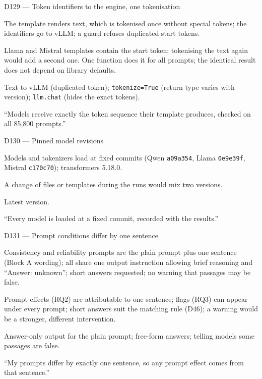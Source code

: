 \documentclass[11pt,a4paper]{report}
\begin{document}
\begin{decisionbox}{D129 --- Token identifiers to the engine, one tokenisation}
\begin{description}[nosep, leftmargin=0pt]
  \item[Decision.] The template renders text, which is tokenised once without special tokens; the identifiers go to vLLM; a guard refuses duplicated start tokens.
  \item[Why.] Llama and Mistral templates contain the start token; tokenising the text again would add a second one. One function does it for all prompts; the identical result does not depend on library defaults.
  \item[Alternatives.] Text to vLLM (duplicated token); \texttt{tokenize=True} (return type varies with version); \texttt{llm.chat} (hides the exact tokens).
  \item[Interview line.] ``Models receive exactly the token sequence their template produces, checked on all 85,800 prompts.''
\end{description}
\end{decisionbox}

\begin{decisionbox}{D130 --- Pinned model revisions}
\begin{description}[nosep, leftmargin=0pt]
  \item[Decision.] Models and tokenizers load at fixed commits (Qwen \texttt{a09a354}, Llama \texttt{0e9e39f}, Mistral \texttt{c170c70}); transformers 5.18.0.
  \item[Why.] A change of files or templates during the runs would mix two versions.
  \item[Alternatives.] Latest version.
  \item[Interview line.] ``Every model is loaded at a fixed commit, recorded with the results.''
\end{description}
\end{decisionbox}

\begin{decisionbox}{D131 --- Prompt conditions differ by one sentence}
\begin{description}[nosep, leftmargin=0pt]
  \item[Decision.] Consistency and reliability prompts are the plain prompt plus one sentence (Block A wording); all share one output instruction allowing brief reasoning and ``Answer: unknown''; short answers requested; no warning that passages may be false.
  \item[Why.] Prompt effects (RQ2) are attributable to one sentence; flags (RQ3) can appear under every prompt; short answers suit the matching rule (D46); a warning would be a stronger, different intervention.
  \item[Alternatives.] Answer-only output for the plain prompt; free-form answers; telling models some passages are false.
  \item[Interview line.] ``My prompts differ by exactly one sentence, so any prompt effect comes from that sentence.''
\end{description}
\end{decisionbox}
\end{document}
